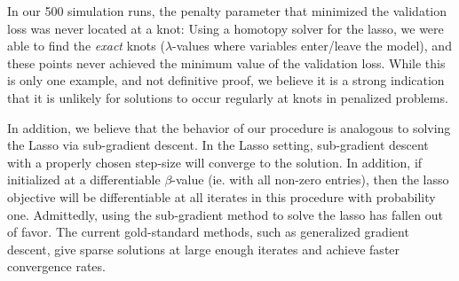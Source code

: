 \documentclass[12pt,letterpaper]{article}
\begin{document}
In our 500 simulation runs, the penalty parameter that minimized the validation loss was never located at a knot: Using a homotopy solver for the lasso, we were able to find the \emph{exact} knots ($\lambda$-values where variables enter/leave the model), and these points never achieved the minimum value of the validation loss. While this is only one example, and not definitive proof, we believe it is a strong indication that it is unlikely for solutions to occur regularly at knots in penalized problems.

In addition, we believe that the behavior of our procedure is analogous to solving the Lasso via sub-gradient descent. In the Lasso setting, sub-gradient descent with a properly chosen step-size will converge to the solution. In addition, if initialized at a differentiable $\beta$-value (ie. with all non-zero entries), then the lasso objective will be differentiable at all iterates in this procedure with probability one. Admittedly, using the sub-gradient method to solve the lasso has fallen out of favor. The current gold-standard methods, such as generalized gradient descent, give sparse solutions at large enough iterates and achieve faster convergence rates.



%
\end{document}
